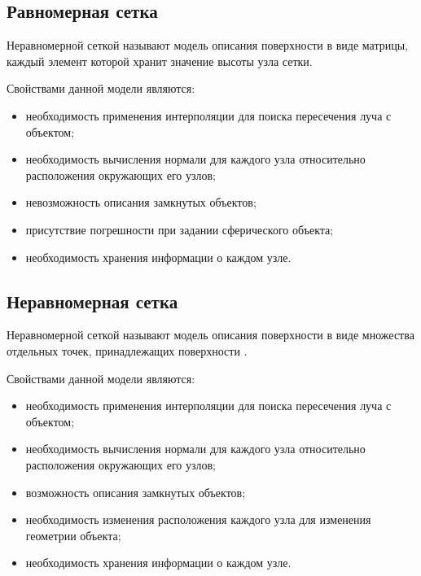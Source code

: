 \subsection{Равномерная сетка}

Неравномерной сеткой называют модель описания поверхности в виде матрицы, каждый элемент которой хранит значение высоты узла сетки.

Свойствами данной модели являются:
\begin{itemize}[label=---]
    \item необходимость применения интерполяции для поиска пересечения луча с объектом;
    \item необходимость вычисления нормали для каждого узла относительно расположения окружающих его узлов;
    \item невозможность описания замкнутых объектов;
    \item присутствие погрешности при задании сферического объекта;
    \item необходимость хранения информации о каждом узле.
\end{itemize}



\subsection{Неравномерная сетка}

Неравномерной сеткой называют модель описания поверхности в виде множества отдельных точек, принадлежащих поверхности \cite{piter_2002}.

Свойствами данной модели являются:
\begin{itemize}[label=---]
    \item необходимость применения интерполяции для поиска пересечения луча с объектом;
    \item необходимость вычисления нормали для каждого узла относительно расположения окружающих его узлов;
    \item возможность описания замкнутых объектов;
    \item необходимость изменения расположения каждого узла для изменения геометрии объекта;
    \item необходимость хранения информации о каждом узле.
\end{itemize}




